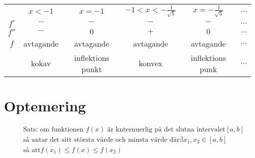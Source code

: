 \documentclass{article}
\begin{document}
\begin{center}
\begin{tabular}{ |c|c|c|c|c|c| } 
 \hline
        & $x<-1$    & $x=-1$            & $-1<x<-\frac{1}{\sqrt{5}}$ & $x=-\frac{1}{\sqrt{5}}$ & $\dots$ \\ 
 $f'$   & $-$       & $-$               & $-$                        & $-$                     & $\dots$ \\ 
 $f''$  & $-$       & $0$               & $+$                        & $0$                     & $\dots$ \\
 $f$    & avtagande & avtagande         & avtagande                  & avtagande               & $\dots$ \\
        & kokav     & inflektions punkt & konvex                     & inflektions punk        & $\dots$ \\
 \hline
\end{tabular}
\end{center}


\newpage


\section{Optemering}
\begin{align*}
  &\quad  \text{Sats: om funktionen $f(x)$ är knternuerlig på det slutna intervalet} [a,b] \\
  &\quad  \text{så antar det sitt största värde och minsta värde där} \exists x_1,x_2\in[a,b] \\
  &\quad  \text{så att} f(x_1) \leq f(x) \leq f(x_2)  \\
\end{align*}
\end{document}
